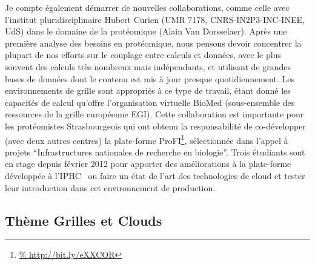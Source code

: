 \documentclass[11pt]{article}
\begin{document}
Je compte également démarrer de nouvelles collaborations, comme celle avec 
l'institut pluridisciplinaire Hubert Curien (UMR 7178, CNRS-IN2P3-INC-INEE, UdS) 
dans le domaine de la protéomique (Alain Van Dorsselaer). Après une première 
analyse des besoins en protéomique, nous pensons devoir concentrer la plupart 
de nos efforts sur le couplage entre calculs et données, avec le plus souvent 
des calculs très nombreux mais indépendants, et utilisant de grandes bases de 
données dont le contenu est mis à jour presque quotidiennement. Les 
environnements de grille sont appropriés à ce type de travail, étant donné les
capacités de calcul qu'offre l'organisation virtuelle BioMed (sous-ensemble
des ressources de la grille européenne EGI). Cette collaboration est importante
pour les protéomistes Strasbourgeois qui ont obtenu la responsabilité de
co-développer (avec deux autres centres) la plate-forme ProFI\footnote{\url{%
http://bit.ly/eXXCOR}}, sélectionnée dans l'appel à projets ``Infrastructures 
nationales de recherche en  biologie''. Trois étudiants sont en stage depuis
février 2012 pour apporter des améliorations à la plate-forme développée à
l'IPHC~\cite{iphc-2011} ou faire un état de l'art des technologies de cloud
et tester leur introduction dans cet environnement de production.
 



\subsection*{Thème Grilles et Clouds}
\end{document}
